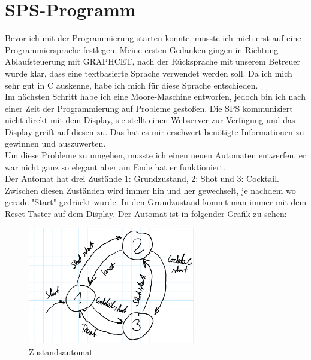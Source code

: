 \documentclass[10pt,a4paper]{report}
\begin{document}
	\chapter{SPS-Programm}
	Bevor ich mit der Programmierung starten konnte, musste ich mich erst auf eine Programmiersprache festlegen. Meine ersten Gedanken gingen in Richtung Ablaufsteuerung mit GRAPHCET, nach der Rücksprache mit unserem Betreuer wurde klar, dass eine textbasierte Sprache verwendet werden soll. Da ich mich sehr gut in C auskenne, habe ich mich für diese Sprache entschieden.\\
	Im nächsten Schritt habe ich eine Moore-Maschine entworfen, jedoch bin ich nach einer Zeit der Programmierung auf Probleme gestoßen. Die SPS kommuniziert nicht direkt mit dem Display, sie stellt einen Webserver zur Verfügung und das Display greift auf diesen zu. Das hat es mir erschwert benötigte Informationen zu gewinnen und auszuwerten.\\
	Um diese Probleme zu umgehen, musste ich einen neuen Automaten entwerfen, er war nicht ganz so elegant aber am Ende hat er funktioniert.\\
	Der Automat hat drei Zustände 1: Grundzustand, 2: Shot und 3: Cocktail. Zwischen diesen Zuständen wird immer hin und her gewechselt, je nachdem wo gerade "Start" gedrückt wurde. In den Grundzustand kommt man immer mit dem Reset-Taster auf dem Display. Der Automat ist in folgender Grafik zu sehen: \\
	
	\begin{figure}[htb]
		\includegraphics[width=0.65\textwidth]{Leons Zustandsautomat}
		\centering
		\caption{Zustandsautomat}
	\end{figure}
	
\end{document}
